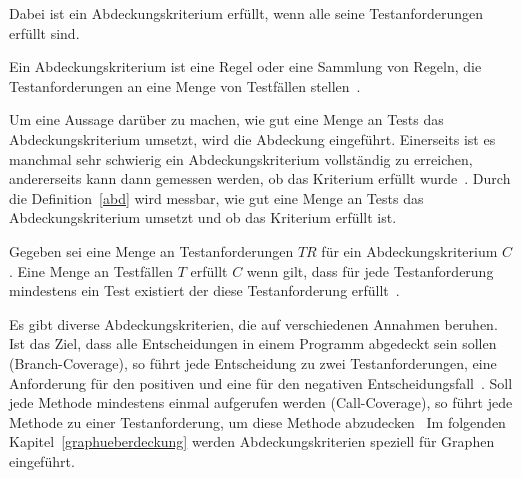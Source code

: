 Dabei ist ein Abdeckungskriterium erfüllt, wenn alle seine Testanforderungen erfüllt sind.

\begin{definition}
    Ein Abdeckungskriterium ist eine Regel oder eine Sammlung von Regeln, die Testanforderungen an eine Menge von Testfällen stellen~\cite[Def. 1.21]{software-testing}.
\end{definition}

Um eine Aussage darüber zu machen, wie gut eine Menge an Tests das Abdeckungskriterium umsetzt, wird die Abdeckung eingeführt.
Einerseits ist es manchmal sehr schwierig ein Abdeckungskriterium vollständig zu erreichen, andererseits kann dann gemessen werden, ob das Kriterium erfüllt wurde~\cite[vgl. S. 18]{software-testing}.
Durch die Definition~\ref{abd} wird messbar, wie gut eine Menge an Tests das Abdeckungskriterium umsetzt und ob das Kriterium erfüllt ist.

\begin{definition}
    Gegeben sei eine Menge an Testanforderungen $TR$ für ein Abdeckungskriterium $C$. 
    Eine Menge an Testfällen $T$ erfüllt $C$ wenn gilt, 
    dass für jede Testanforderung mindestens ein Test existiert der diese Testanforderung erfüllt~\cite[vgl. Def. 1.22]{software-testing}.
    \label{abd}
\end{definition}

Es gibt diverse Abdeckungskriterien, die auf verschiedenen Annahmen beruhen.
Ist das Ziel, dass alle Entscheidungen in einem Programm abgedeckt sein sollen (Branch-Coverage), so führt jede Entscheidung zu zwei
Testanforderungen, eine Anforderung für den positiven und eine für den negativen Entscheidungsfall~\cite[vgl. S. 17]{software-testing}.
Soll jede Methode mindestens einmal aufgerufen werden (Call-Coverage), so führt jede Methode zu einer Testanforderung, um diese Methode abzudecken~\cite[vgl. S. 17]{software-testing}
Im folgenden Kapitel~\ref{graphueberdeckung} werden Abdeckungskriterien speziell für Graphen eingeführt.